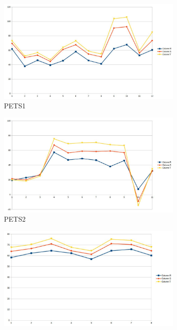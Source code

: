 \documentclass[12pt]{report}
\begin{document}
\begin{figure}
  \centering
  \begin{subfigure}{.49\linewidth}
 \includegraphics[width=1\linewidth]{figures/rgshift_pets1.jpg}
  \caption{PETS1}
\end{subfigure}
\hfill
\begin{subfigure}{.49\linewidth}
 \includegraphics[width=1\linewidth]{figures/rgshift_pets2.jpg}
  \caption{PETS2}
\end{subfigure}
\hfill
\begin{subfigure}{.49\linewidth}
 \includegraphics[width=1\linewidth]{figures/rgshift_highway1.jpg}

\end{subfigure}
\end{figure}
\end{document}
